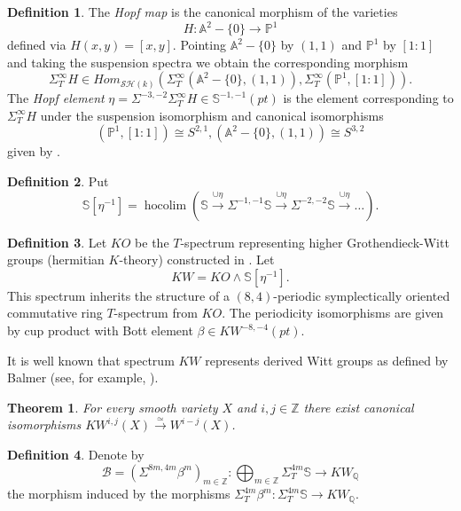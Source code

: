 \documentclass[a4paper,12pt,draft]{amsart}
\newtheorem{theorem}{Theorem}
\theoremstyle{definition}
\newtheorem{definition}{Definition}
\theoremstyle{remark}
\begin{document}
\begin{definition}
The \textit{Hopf map} is the canonical morphism of the varieties
\[
H\colon {{\mathbb A}}^2-\{0\} \to \mathbb{P}^1
\]
defined via $H(x,y)=[x,y]$. Pointing ${{\mathbb A}}^2-\{0\}$ by $(1,1)$ and $\mathbb{P}^1$ by $[1:1]$ and taking the suspension spectra we obtain the corresponding morphism
\[
\Sigma^\infty_{T} H \in Hom_{{\mathcal{SH}} (k)}(\Sigma^\infty_{T} ({{\mathbb A}}^2-\{0\},(1,1)),\Sigma^\infty_{T} (\mathbb{P}^1,[1:1])).
\]
The \textit{Hopf element} $\eta=\Sigma^{-3,-2} \Sigma^\infty_{T} H\in \mathbb{S}^{-1,-1}(pt)$ is the element corresponding to $\Sigma^\infty_{T} H$ under the suspension isomorphism and canonical isomorphisms 
\[
(\mathbb{P}^1,[1:1])\cong S^{2,1}, ({{\mathbb A}}^2-\{0\},(1,1))\cong S^{3,2}
\]
given by \cite[Lemma 3.2.15, Corollary 3.2.18 Example 3.2.20]{MV99}.
\end{definition}

\begin{definition}
Put
\[
\mathbb{S}[\eta^{-1}]={\operatorname{hocolim}} \left(\mathbb{S} \xrightarrow{ \cup \eta} \Sigma^{-1,-1}\mathbb{S} \xrightarrow{\cup \eta} \Sigma^{-2,-2}\mathbb{S} \xrightarrow{ \cup \eta} \dots \right).
\]
\end{definition}

\begin{definition}
Let $KO$ be the $T$-spectrum representing higher Grothendieck-Witt groups (hermitian $K$-theory) constructed in \cite{PW10}. Let  
\[
KW=KO\wedge \mathbb{S}[\eta^{-1}].
\]
This spectrum inherits the structure of a $(8,4)$-periodic symplectically oriented commutative ring $T$-spectrum from $KO$. The periodicity isomorphisms are given by cup product with Bott element $\beta \in KW^{-8,-4}(pt)$.
\end{definition}

It is well known that spectrum $KW$ represents derived Witt groups as defined by Balmer \cite{Bal99} (see, for example, \cite[Theorem~5]{An12}).

\begin{theorem} \label{thm:KW_represents}
For every smooth variety $X$ and $i,j\in {{\mathbb Z}}$ there exist canonical isomorphisms $KW^{i,j}(X)\xrightarrow{\simeq} W^{i-j}(X)$. 
\end{theorem}

\begin{definition}\label{def:B}
Denote by
\[
\mathcal{B}=\left( \Sigma^{8m,4m}\beta^m \right)_{m\in {{\mathbb Z}}}  \colon \bigoplus_{m\in {{\mathbb Z}}} \Sigma^{4m}_T \mathbb{S} \to KW_{{\mathbb Q}}
\]
the morphism induced by the morphisms $\Sigma^{4m}_T \beta^m\colon \Sigma^{4m}_T \mathbb{S} \to KW_{{\mathbb Q}}$.
\end{definition}
\end{document}

